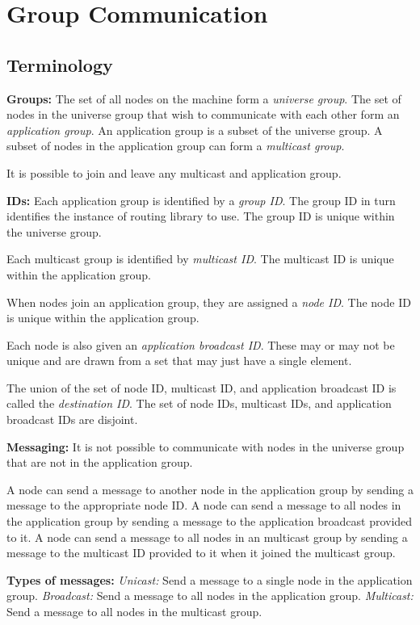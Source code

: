 \documentclass[a4paper,twoside]{report} %
\begin{document}
\chapter{Group Communication}

\section{Terminology}

\textbf{Groups:}
The set of all nodes on the machine form a \emph{universe group}.
The set of nodes in the universe group that
wish to communicate with each other form an \emph{application group}.
An application group is a subset of the universe group.
A subset of nodes in the application group can form a \emph{multicast group}.

It is possible to join and leave any multicast and application group.

\textbf{IDs:}
Each application group is identified by a \emph{group ID}.
The group ID in turn identifies the instance of routing library to use.
The group ID is unique within the universe group.

Each multicast group is identified by \emph{multicast ID}.
The multicast ID is unique within the application group.

When nodes join an application group, they are assigned a \emph{node ID}.
The node ID is unique within the application group.

Each node is also given an \emph{application broadcast ID}.
These may or may not be unique and are drawn from a set that
may just have a single element.

The union of the set of node ID, multicast ID, and application broadcast ID is
called the \emph{destination ID}.
The set of node IDs, multicast IDs, and application broadcast IDs are disjoint.

\textbf{Messaging:}
It is not possible to communicate with nodes in the universe group that
are not in the application group.

A node can send a message to another node in the application group by
sending a message to the appropriate node ID.
A node can send a message to all nodes in the application group by
sending a message to the application broadcast provided to it.
A node can send a message to all nodes in an multicast group by
sending a message to the multicast ID provided to it
when it joined the multicast group.

\textbf{Types of messages:}
\emph{Unicast:} Send a message to a single node in the application group.
\emph{Broadcast:} Send a message to all nodes in the application group.
\emph{Multicast:} Send a message to all nodes in the multicast group.
\end{document}
